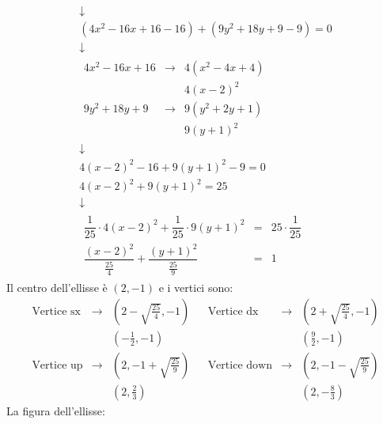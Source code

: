 \documentclass[a4paper]{article}
\begin{document}
	\begin{gather*}
		\downarrow \\
		\left(4x^{2} - 16x + 16 - 16\right) + \left(9y^{2} + 18y + 9 - 9\right) = 0 \\
		\downarrow \\
		\begin{array}{rcl}
			4x^{2} - 16x + 16 &\rightarrow& 4\left(x^{2} - 4x + 4\right) \\ [.3em]
										 && 4\left(x-2\right)^{2} \\ [1em]
			9y^{2} + 18y + 9  &\rightarrow& 9\left(y^{2} + 2y + 1\right) \\ [.3em]
										 && 9\left(y+1\right)^{2}
		\end{array} \\
		\downarrow \\
		4\left(x-2\right)^{2} - 16 + 9\left(y+1\right)^{2} - 9 = 0 \\
		4\left(x-2\right)^{2} + 9\left(y+1\right)^{2} = 25 \\
		\downarrow \\
		\begin{array}{rcl}
			\dfrac{1}{25} \cdot 4\left(x-2\right)^{2} + \dfrac{1}{25} \cdot 9\left(y+1\right)^{2} &=& 25 \cdot \dfrac{1}{25} \\ [1em]
			\dfrac{\left(x-2\right)^{2}}{\frac{25}{4}} + \dfrac{\left(y+1\right)^{2}}{\frac{25}{9}} &=& 1
		\end{array}
	\end{gather*}
	Il centro dell'ellisse è $\left(2, -1\right)$ e i vertici sono:
	\begin{equation*}
		\begin{array}{lclclcl}
			\text{Vertice sx} &\rightarrow& \left(2-\sqrt{\frac{25}{4}}, -1\right) && \text{Vertice dx} &\rightarrow& \left(2+\sqrt{\frac{25}{4}}, -1\right) \\ [.8em]
										 && \left(-\frac{1}{2}, -1\right) && && \left(\frac{9}{2}, -1\right) \\ [.8em]
			\text{Vertice up} &\rightarrow& \left(2, -1 + \sqrt{\frac{25}{9}}\right) && \text{Vertice down} &\rightarrow& \left(2, -1-\sqrt{\frac{25}{9}}\right) \\ [.8em]
			&& \left(2, \frac{2}{3}\right) && && \left(2, -\frac{8}{3}\right)
		\end{array}
	\end{equation*}
	La figura dell'ellisse:
\end{document}

